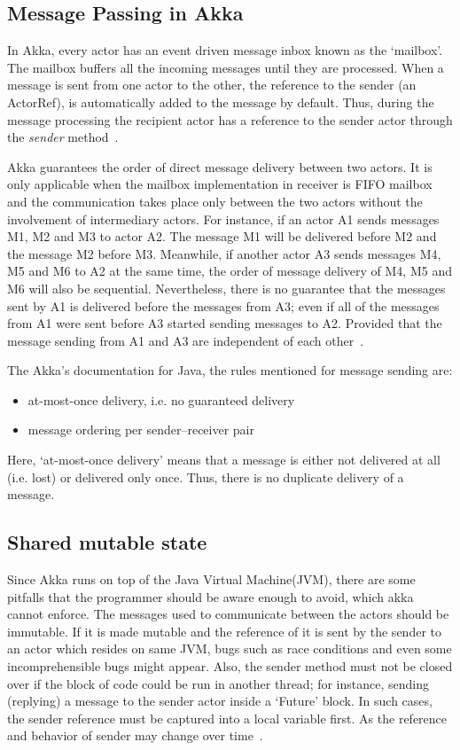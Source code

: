  \subsection{Message Passing in Akka}
  \label{subsec:akkaMessagePassing}
  In Akka, every actor has an event driven message inbox known as the ‘mailbox’. The mailbox buffers all the incoming messages until they are processed. When a message is sent from one actor to the other, the reference to the sender (an ActorRef), is automatically added to the message by default. Thus, during the message processing the recipient actor has a reference to the sender actor through the \emph{sender} method~\cite{akkaJavaDoc}.

  Akka guarantees the order of direct message delivery between two actors. It is only applicable when the mailbox implementation in receiver is FIFO mailbox and the communication takes place only between the two actors without the involvement of intermediary actors. For instance, if an actor A1 sends messages M1, M2 and M3 to actor A2. The message M1 will be delivered before M2 and the message M2 before M3. Meanwhile, if another actor A3 sends messages M4, M5 and M6 to A2 at the same time, the order of message delivery of M4, M5 and M6 will also be sequential. Nevertheless, there is no guarantee that the messages sent by A1 is delivered before the messages from A3; even if all of the messages from A1 were sent before A3 started sending messages to A2. Provided that the message sending from A1 and A3 are independent of each other~\cite{akkaJavaDoc}.

  The Akka's documentation for Java, the rules mentioned for message sending are: \cite{akkaJavaDoc}
  \begin{itemize}
    \item at-most-once delivery, i.e. no guaranteed delivery
    \item message ordering per sender–receiver pair
  \end{itemize}

Here, ‘at-most-once delivery’ means that a message is either not delivered at all (i.e. lost) or delivered only once. Thus, there is no duplicate delivery of a message.

  \subsection{Shared mutable state}
  Since Akka runs on top of the Java Virtual Machine(JVM), there are some pitfalls that the programmer should be aware enough to avoid, which akka cannot enforce. The messages used to communicate between the actors should be immutable. If it is made mutable and the reference of it is sent by the sender to an actor which resides on same JVM, bugs such as race conditions and even some incomprehensible bugs might appear. Also, the sender method must not be closed over if the block of code could be run in another thread; for instance, sending (replying) a message to the sender actor inside a ‘Future’ block. In such cases, the sender reference must be captured into a local variable first. As the reference and behavior of sender may change over time~\cite{akkaJavaDoc}.

